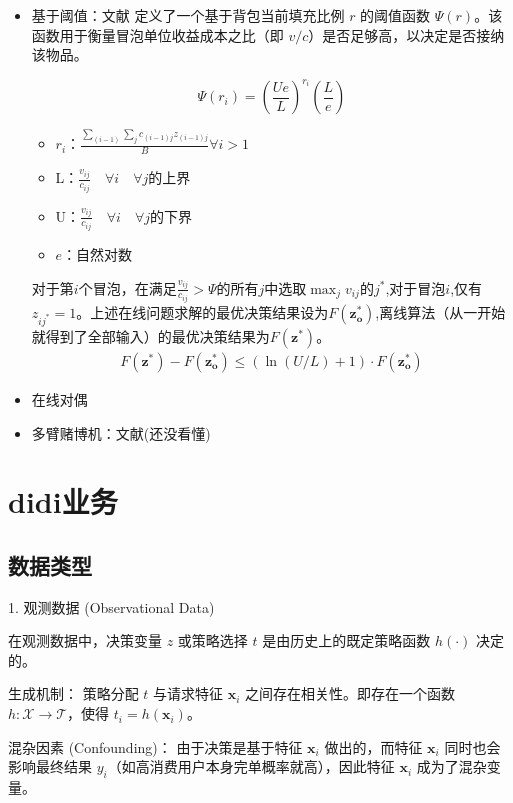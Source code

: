 \documentclass[12pt, a4paper]{article}
\begin{document}
\begin{itemize}
    \item 基于阈值：文献\cite{chakrabarty2008online}
定义了一个基于背包当前填充比例 $r$ 的阈值函数 $\Psi(r)$。该函数用于衡量冒泡单位收益成本之比（即 $v/c$）是否足够高，以决定是否接纳该物品。\par
$$\Psi(r_i) = \left( \frac{Ue}{L} \right)^{r_i} \left( \frac{L}{e} \right)$$
\begin{itemize}
    \item $r_i$：$\frac{\sum_{(i-1)}\sum_j c_{(i-1)j}z_{(i-1)j}}{B} \forall i>1$
    \item L：$\frac{v_{ij}}{c_{ij}} \quad\forall i\quad\forall j$的上界
    \item U：$\frac{v_{ij}}{c_{ij}}\quad\forall i\quad\forall j$的下界
    \item $e$：自然对数
\end{itemize}
\par
对于第$i$个冒泡，在满足$\frac{v_{ij}}{c_{ij}}>\Psi$的所有$j$中选取$\max_j{v_{ij}}$的$j^*$,对于冒泡$i$,仅有$z_{ij^*}=1$。上述在线问题求解的最优决策结果设为$F(\bm{z_o^*})$,离线算法（从一开始就得到了全部输入）的最优决策结果为$F(\bm{z^*})$。
\begin{equation}
\begin{aligned}
F(\bm{z^*})-F(\bm{z_o^*})\le (\ln(U/L)+1)\cdot F(\bm{z_o^*})
\end{aligned}
\end{equation}
    \item 在线对偶\cite{buchbinder2009online}
    \item 多臂赌博机：文献\cite{badanidiyuru2018bandits}(还没看懂)
\end{itemize}
\section{didi业务}
\subsection{数据类型}

1. 观测数据 (Observational Data)

在观测数据中，决策变量 $z$ 或策略选择 $t$ 是由历史上的既定策略函数 $h(\cdot)$ 决定的。

生成机制： 策略分配 $t$ 与请求特征 $\mathbf{x}_i$ 之间存在相关性。即存在一个函数 $h: \mathcal{X} \rightarrow \mathcal{T}$，使得 $t_i = h(\mathbf{x}_i)$。

混杂因素 (Confounding)： 由于决策是基于特征 $\mathbf{x}_i$ 做出的，而特征 $\mathbf{x}_i$ 同时也会影响最终结果 $y_i$（如高消费用户本身完单概率就高），因此特征 $\mathbf{x}_i$ 成为了混杂变量。
\end{document}
